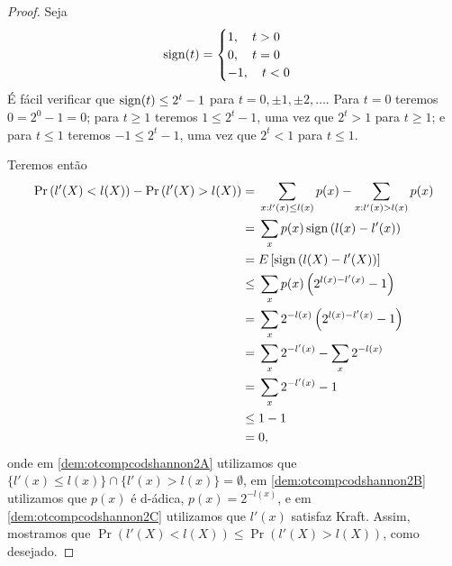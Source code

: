 \begin{proof}
Seja
\begin{equation}
\operatorname{sign}(t) = \begin{cases}
        1 , \quad t > 0 \\
        0 , \quad t = 0 \\
        -1 , \quad t < 0
        \end{cases}
\end{equation}
É fácil verificar que $\operatorname{sign}(t) \leq 2^t -1$ para $t=0,\pm 1, \pm 2, \ldots$.
Para $t = 0$ teremos $0 = 2^0 - 1 = 0$;
para $t \geq 1$ teremos $1 \leq 2^t - 1$, uma vez que $2^t > 1$ para $t \geq 1$;
e para $t \leq 1$ teremos $-1 \leq 2^t - 1$, uma vez que $2^t < 1$ para $t \leq 1$.

Teremos então
\begin{subequations}
{%
\allowdisplaybreaks
\begin{align}
\Pr \left( l'(X) < l(X) \right) - \Pr \left( l'(X) > l(X) \right) ={}& \sum_{x:l'(x) \leq l(x)} p(x) - \sum_{x:l'(x)>l(x)} p(x) \\
             ={}& \sum_x p(x) \sign\left( l(x)-l'(x) \right) \label{dem:otcompcodshannon2A}\\
             ={}& E \left[ \sign \left( l(X) - l'(X) \right) \right] \\
             \leq{}& \sum_x p(x) \left( 2^{l(x) - l'(x)} - 1\right) \\
             ={}& \sum_x 2^{-l(x)} \left( 2^{l(x)-l'(x)} - 1 \right) \label{dem:otcompcodshannon2B}\\
             ={}& \sum_x 2^{-l'(x)} - \sum_x 2^{-l(x)} \\
             ={}& \sum_x 2^{-l'(x)} - 1 \\
             \leq{}& 1 - 1 \label{dem:otcompcodshannon2C} \\
             ={}& 0,
\end{align}
}%
\end{subequations}
onde em \ref{dem:otcompcodshannon2A} utilizamos que $\{l'(x) \leq l(x)\} \cap \{l'(x)>l(x)\} = \emptyset$,
em \ref{dem:otcompcodshannon2B} utilizamos que $p(x)$ é d-ádica, $p(x)=2^{-l(x)}$, e em \ref{dem:otcompcodshannon2C} 
utilizamos que $l'(x)$ satisfaz Kraft.
Assim, mostramos que $\Pr \left( l'(X) < l(X) \right) \leq \Pr \left( l'(X) > l(X) \right)$, como desejado.
\end{proof}




